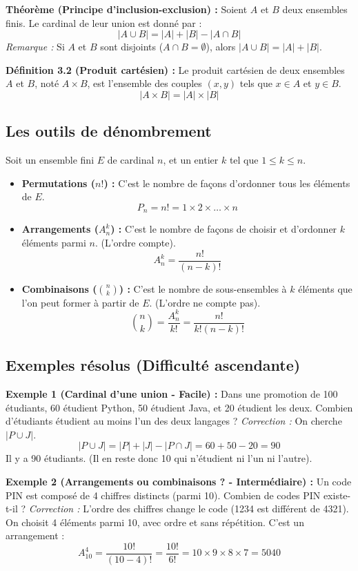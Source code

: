 \textbf{Théorème (Principe d'inclusion-exclusion) :}
Soient $A$ et $B$ deux ensembles finis. Le cardinal de leur union est donné par :
$$ |A \cup B| = |A| + |B| - |A \cap B| $$
\textit{Remarque :} Si $A$ et $B$ sont disjoints ($A \cap B = \emptyset$), alors $|A \cup B| = |A| + |B|$.



\textbf{Définition 3.2 (Produit cartésien) :}
Le produit cartésien de deux ensembles $A$ et $B$, noté $A \times B$, est l'ensemble des couples $(x, y)$ tels que $x \in A$ et $y \in B$.
$$ |A \times B| = |A| \times |B| $$

\subsection{Les outils de dénombrement}
Soit un ensemble fini $E$ de cardinal $n$, et un entier $k$ tel que $1 \le k \le n$.

\begin{itemize}
    \item \textbf{Permutations ($n!$) :} C'est le nombre de façons d'ordonner tous les éléments de $E$.
    $$ P_n = n! = 1 \times 2 \times \dots \times n $$
    \item \textbf{Arrangements ($A_n^k$) :} C'est le nombre de façons de choisir et d'ordonner $k$ éléments parmi $n$. (L'ordre compte).
    $$ A_n^k = \frac{n!}{(n-k)!} $$
    \item \textbf{Combinaisons ($\binom{n}{k}$) :} C'est le nombre de sous-ensembles à $k$ éléments que l'on peut former à partir de $E$. (L'ordre ne compte pas).
    $$ \binom{n}{k} = \frac{A_n^k}{k!} = \frac{n!}{k!(n-k)!} $$
\end{itemize}

\subsection{Exemples résolus (Difficulté ascendante)}

\textbf{Exemple 1 (Cardinal d'une union - Facile) :} 
Dans une promotion de 100 étudiants, 60 étudient Python, 50 étudient Java, et 20 étudient les deux. Combien d'étudiants étudient au moins l'un des deux langages ?
\textit{Correction :} On cherche $|P \cup J|$.
$$ |P \cup J| = |P| + |J| - |P \cap J| = 60 + 50 - 20 = 90 $$
Il y a 90 étudiants. (Il en reste donc 10 qui n'étudient ni l'un ni l'autre).

\textbf{Exemple 2 (Arrangements ou combinaisons ? - Intermédiaire) :}
Un code PIN est composé de 4 chiffres distincts (parmi 10). Combien de codes PIN existe-t-il ?
\textit{Correction :} L'ordre des chiffres change le code (1234 est différent de 4321). On choisit 4 éléments parmi 10, avec ordre et sans répétition. C'est un arrangement :
$$ A_{10}^4 = \frac{10!}{(10-4)!} = \frac{10!}{6!} = 10 \times 9 \times 8 \times 7 = 5040 $$

